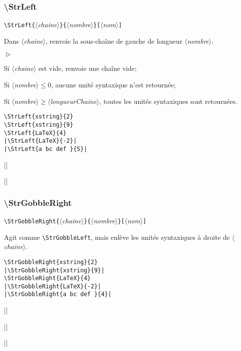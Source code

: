 \documentclass[a4paper,10pt]{article}
\newcommand\argu[1]{$\langle$\textit{#1}$\rangle$}
\newcommand\ARGU[1]{\texttt{\color{black}\{}\argu{#1}\texttt{\color{black}\}}}
\newcommand\arguC[1]{\texttt{\color{black}[}\argu{#1}\texttt{\color{black}]}}
\newenvironment{Conditions}[1][1cm]%
{\begin{list}%
	{$\vartriangleright$}%
	{\setlength{\leftmargin}{#1}
	 \setlength{\itemsep}{0pt}
	 \setlength{\parsep}{0pt}
	 \setlength{\topsep}{2ptplus3ptminus2pt}
	}}%
{\end{list}}
\newcommand\US{unité syntaxique\xspace}
\newcommand\USs{unités syntaxiques\xspace}
\newcommand\styleexemple{\small\vskip4pt}
\newcommand\verbinline{\lstinline[basicstyle=\normalsize\ttfamily]}
\begin{document}
\subsubsection{\ttfamily\textbackslash StrLeft}
\verbinline|\StrLeft|\ARGU{chaine}\ARGU{nombre}\arguC{nom}
\smallskip

Dans \argu{chaine}, renvoie la sous-chaîne de gauche de longueur \argu{nombre}.\medskip

\begin{Conditions}
	\item Si \argu{chaine} est vide, renvoie une chaîne vide;
	\item Si \argu{nombre}${}\leqslant0$, aucune \US n'est retournée;
	\item Si \argu{nombre}${}\geqslant{}$\argu{longueurChaine}, toutes les \USs sont retournées.
\end{Conditions}

\begin{minipage}[t]{0.65\linewidth}
\begin{lstlisting}
\StrLeft{xstring}{2}
\StrLeft{xstring}{9}
\StrLeft{LaTeX}{4}
|\StrLeft{LaTeX}{-2}|
|\StrLeft{a bc def }{5}|
\end{lstlisting}%
\end{minipage}\hfill
\begin{minipage}[t]{0.35\linewidth}
	\styleexemple
	\par
	\par
	\par
	||\par
	||
\end{minipage}%

\subsubsection{\ttfamily\textbackslash StrGobbleRight}
\verbinline|\StrGobbleRight|\ARGU{chaine}\ARGU{nombre}\arguC{nom}
\smallskip

Agit comme \verbinline|\StrGobbleLeft|, mais enlève les \USs à droite de \argu{chaine}.

\begin{minipage}[t]{0.65\linewidth}
\begin{lstlisting}
\StrGobbleRight{xstring}{2}
|\StrGobbleRight{xstring}{9}|
\StrGobbleRight{LaTeX}{4}
|\StrGobbleRight{LaTeX}{-2}|
|\StrGobbleRight{a bc def }{4}|
\end{lstlisting}%
\end{minipage}\hfill
\begin{minipage}[t]{0.35\linewidth}
	\styleexemple
	\par
	||\par
	\par
	||\par
	||
\end{minipage}%
\end{document}
